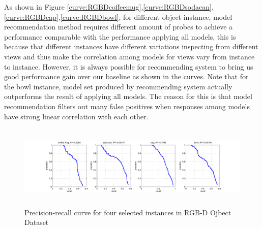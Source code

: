 \documentclass{article} %
\begin{document}
As shown in Figure \ref{curve:RGBDcoffeemug},\ref{curve:RGBDsodacan},\ref{curve:RGBDcap},\ref{curve:RGBDbowl}, for different object instance, model recommendation method requires different amount of probes to achieve a performance comparable with the performance applying all models, this is because that different instances have different variations inspecting from different views and thus make the correlation among models for views vary from instance to instance. However, it is always possible for recommending system to bring us good performance gain over our baseline as shown in the curves. Note that for the bowl instance, model set produced by recommending system actually outperforms the result of applying all models. The reason for this is that model recommendation filters out many false positives when responses among models have strong linear correlation with each other.

\begin{figure}
\begin{center}
\includegraphics[width=14cm,height=4cm]{fig/apcurve.pdf}
\caption{Precision-recall curve for four selected instances in RGB-D Ojbect Dataset}
\label{ap}
\end{center}
\end{figure}
\end{document}
